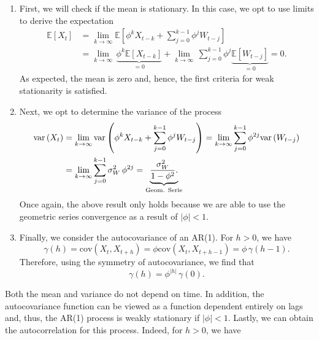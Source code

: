 \documentclass[]{book}
\providecommand{\tightlist}{%
  \setlength{\itemsep}{0pt}\setlength{\parskip}{0pt}}
\theoremstyle{definition}
\theoremstyle{definition}
\theoremstyle{definition}
\theoremstyle{remark}
\begin{document}
\begin{enumerate}
\def\labelenumi{\arabic{enumi}.}
\tightlist
\item
  First, we will check if the mean is stationary. In this case, we opt
  to use limits to derive the expectation \[\begin{aligned}
  \mathbb{E}\left[ {{X_t}} \right] &= \mathop {\lim }\limits_{k \to \infty } \mathbb{E}\left[ {{\phi^k}{X_{t-k}} + \sum\limits_{j = 0}^{k - 1} {\phi^j{W_{t - j}}} } \right] \\
  &= \mathop {\lim }\limits_{k \to \infty } \, \underbrace {{\phi ^k}{\mathbb{E}[X_{t-k}]}}_{= 0} + \mathop {\lim }\limits_{k \to \infty } \, \sum\limits_{j = 0}^{k - 1} {\phi^j\underbrace {\mathbb{E}\left[ {{W_{t - j}}} \right]}_{ = 0}}
  = 0.
  \end{aligned} \] As expected, the mean is zero and, hence, the first
  criteria for weak stationarity is satisfied.
\item
  Next, we opt to determine the variance of the process
  \[\begin{aligned}
  \text{var}\left( {{X_t}} \right) &= \mathop {\lim }\limits_{k \to \infty } \text{var}\left( {{\phi^k}{X_{t-k}} + \sum\limits_{j = 0}^{k - 1} {\phi^j{W_{t - j}}} } \right)
  = \mathop {\lim }\limits_{k \to \infty } \sum\limits_{j = 0}^{k - 1} {\phi ^{2j} \text{var}\left( {{W_{t - j}}} \right)}  \\
  &= \mathop {\lim }\limits_{k \to \infty } \sum\limits_{j = 0}^{k - 1} \sigma _W^2 \, {\phi ^{2j}}  =  
    \underbrace {\frac{\sigma _W^2}{{1 - {\phi ^2}}}.}_{\begin{subarray}{l} 
      {\text{Geom. Serie}} 
      \end{subarray}}
  \end{aligned} \] Once again, the above result only holds because we
  are able to use the geometric series convergence as a result of
  \(\left| \phi \right| < 1\).
\item
  Finally, we consider the autocovariance of an AR(1). For \(h > 0\), we
  have
  \[\gamma \left( h \right) =  \text{cov}\left( {{X_t},{X_{t + h}}} \right) = \phi \text{cov}\left( {{X_t},{X_{t + h - 1}}} \right) = \phi \, \gamma \left( h-1 \right).\]
  Therefore, using the symmetry of autocovariance, we find that
  \[\gamma \left( h \right) = \phi^{|h|} \, \gamma(0).\]
\end{enumerate}

Both the mean and variance do not depend on time. In addition, the
autocovariance function can be viewed as a function dependent entirely
on lags and, thus, the AR(1) process is weakly stationary if
\(\left| \phi \right| < 1\). Lastly, we can obtain the autocorrelation
for this process. Indeed, for \(h > 0\), we have
\end{document}
